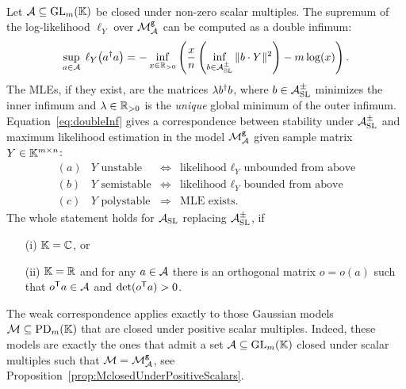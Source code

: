 \begin{theorem} \label{thm:WeakCorrespondence}
	\ \\
	Let $\mathcal{A} \subseteq \operatorname{GL}_m(\mathbb K)$ be closed under non-zero scalar multiples. The supremum of the log-likelihood $\ell_Y$ over $\mathcal{M}^{\mathtt{g}}_{\mathcal{A}}$ can be computed as a double infimum:
		\begin{equation}\label{eq:doubleInf}
			\sup_{a \in \mathcal{A}} \; \ell_Y \big(a^{\dagger} a \big)
			= - \inf_{x \in \mathbb R_{>0}} \left( \frac{x}{n} \left( \inf_{b \in \mathcal{A}_{\operatorname{SL}}^{\pm}} \|b \cdot Y\|^2 \right) - m \log(x) \right).
		\end{equation}
	The MLEs, if they exist, are the matrices $\lambda b^{\dagger} b$, where $b \in \mathcal{A}_{\operatorname{SL}}^{\pm}$ minimizes the inner infimum and $\lambda \in \mathbb R_{>0}$ is the \emph{unique} global minimum of the outer infimum.
	Equation~\eqref{eq:doubleInf} gives a correspondence between stability under $\mathcal{A}_{\operatorname{SL}}^{\pm}$ and maximum likelihood estimation in the model $\mathcal{M}^{\mathtt{g}}_{\mathcal{A}}$ given sample matrix $Y \in \mathbb K^{m \times n}$: 
	$$ \begin{matrix} (a) & Y \text{ unstable}  & \Leftrightarrow & \text{likelihood $\ell_Y$ unbounded from above} \\ 
		(b) &  Y \text{ semistable} & \Leftrightarrow & \text{likelihood $\ell_Y$ bounded from above} \\ 
		(c) & Y \text{ polystable}  & \Rightarrow & \text{MLE exists.} \end{matrix} $$
	The whole statement holds for $\mathcal{A}_{\operatorname{SL}}$ replacing $\mathcal{A}_{\operatorname{SL}}^{\pm}$, if
		\begin{itemize}
			\item[(i)] $\mathbb K = \mathbb C$, or
			\item[(ii)] $\mathbb K = \mathbb R$ and for any $a \in \mathcal{A}$ there is an orthogonal matrix $o = o(a)$ such that $o^{\mathsf{T}} a \in \mathcal{A}$ and $\det(o^{\mathsf{T}} a) > 0$.
		\end{itemize}
\end{theorem}

\begin{remark}\label{rem:WeakCorrespMclosedUnderPositiveScalars}
	The weak correspondence applies exactly to those Gaussian models $\mathcal{M} \subseteq \operatorname{PD}_m(\mathbb K)$ that are closed under positive scalar multiples. Indeed, these models are exactly the ones that admit a set $\mathcal{A} \subseteq \operatorname{GL}_m(\mathbb K)$ closed under scalar multiples such that $\mathcal{M} = \mathcal{M}^{\mathtt{g}}_{\mathcal{A}}$, see Proposition~\ref{prop:MclosedUnderPositiveScalars}.
	\hfill\remSymbol
\end{remark}

